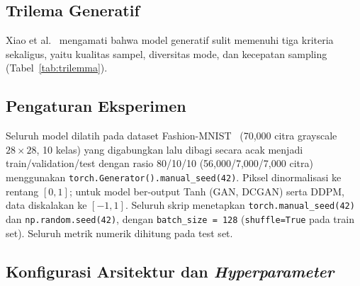 \documentclass{article}
\begin{document}
\subsection{Trilema Generatif}
Xiao et al.~\cite{xiao2022} mengamati bahwa model generatif sulit memenuhi tiga kriteria sekaligus, yaitu kualitas sampel, diversitas mode, dan kecepatan sampling (Tabel~\ref{tab:trilemma}).

\begin{table}[H]
    \centering
    \caption{Trilema generatif~\cite{xiao2022}}
    \label{tab:trilemma}
\end{table}

\subsection{Pengaturan Eksperimen}
Seluruh model dilatih pada dataset Fashion-MNIST~\cite{xiao2017} (70,000 citra grayscale $28\times28$, 10 kelas) yang digabungkan lalu dibagi secara acak menjadi train/validation/test dengan rasio 80/10/10 (56,000/7,000/7,000 citra) menggunakan \texttt{torch.Generator().manual\_seed(42)}. Piksel dinormalisasi ke rentang $[0,1]$; untuk model ber-output Tanh (GAN, DCGAN) serta DDPM, data diskalakan ke $[-1,1]$. Seluruh skrip menetapkan \texttt{torch.manual\_seed(42)} dan \texttt{np.random.seed(42)}, dengan \texttt{batch\_size = 128} (\texttt{shuffle=True} pada train set). Seluruh metrik numerik dihitung pada test set.

\subsection{Konfigurasi Arsitektur dan \textit{Hyperparameter}}
\end{document}
